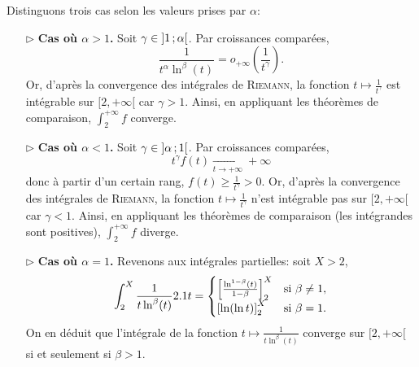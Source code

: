 \begin{demo}
    Distinguons trois cas selon les valeurs prises par $\alpha$:
    \begin{enumerate}
        \item[$\rhd$] \textbf{Cas où $\alpha > 1$.} Soit $\gamma \in \left]1\,;\alpha\right[$. Par croissances comparées,
        $$\displaystyle \frac{1}{t^{\alpha} \ln^{\beta} (t)} = o_{+ \infty} \left( \frac{1}{t^{\gamma}} \right).$$
        Or, d'après la convergence des intégrales de \textsc{Riemann}, la fonction $t \mapsto \frac{1}{t^\gamma}$ est intégrable sur $[2, +\infty[$ car $\gamma > 1$. Ainsi, en appliquant les théorèmes de comparaison, $\int_2^{+ \infty} f$ converge.

        \item[$\rhd$] \textbf{Cas où $\alpha < 1$.} Soit $\gamma \in \left]\alpha\,;1\right[$. Par croissances comparées,
        $$t^{\gamma} f(t) \xrightarrow[t \to + \infty]{} + \infty$$
        donc à partir d'un certain rang, $f(t) \geqslant \frac{1}{t^{\gamma}} > 0$. Or, d'après la convergence des intégrales de \textsc{Riemann}, la fonction $t \mapsto \frac{1}{t^\gamma}$ n'est intégrable pas sur $[2, +\infty[$ car $\gamma < 1$. Ainsi, en appliquant les théorèmes de comparaison (les intégrandes sont positives), $\int_2^{+ \infty} f$ diverge.
        
        \item[$\rhd$] \textbf{Cas où $\alpha = 1$.} Revenons aux intégrales partielles: soit $X > 2$,
        $$\int_{2}^{X} \frac{1}{t \ln^{\beta} (t)} 2.1 t = 
        \begin{cases}
            \left[ \frac{\ln ^{1-\beta} (t)}{1-\beta} \right]_2 ^X & \text{si } \beta \not = 1, \\
            \left[\ln (\ln t) \right]_2 ^X & \text{si } \beta = 1.
        \end{cases}
        $$
        On en déduit que l'intégrale de la fonction $t \mapsto \frac{1}{t \ln^{\beta} (t)}$ converge sur $[2, + \infty[$ si et seulement si $\beta > 1$.
    \end{enumerate}
\end{demo}



